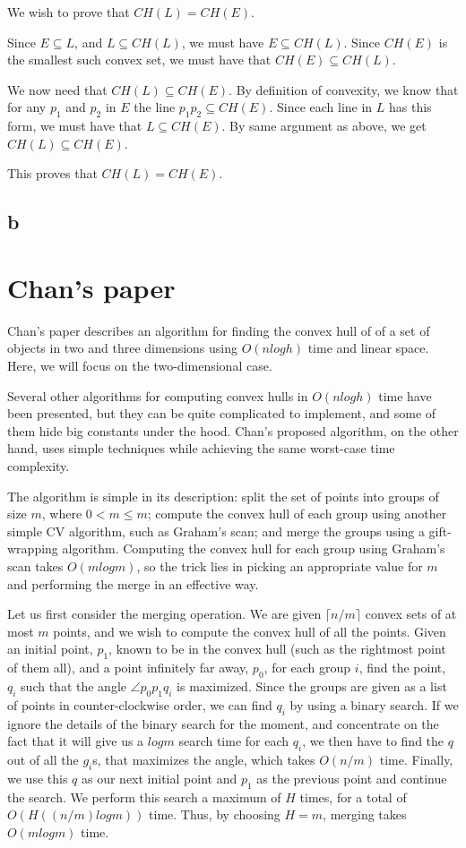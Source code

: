 \documentclass[11pt,a4paper]{article}
\begin{document}
We wish to prove that $CH(L) = CH(E)$.

Since $E \subseteq L$, and $L \subseteq CH(L)$, we must have $E \subseteq CH(L)$. Since
$CH(E)$ is the smallest such convex set, we must have that $CH(E) \subseteq CH(L)$.

We now need that $CH(L) \subseteq CH(E)$. By definition of convexity, we know that for any
$p_1$ and $p_2$ in $E$ the line $p_1p_2 \subseteq CH(E)$. Since each line in $L$ has this
form, we must have that $L \subseteq CH(E)$. By same argument as above, we get $CH(L) \subseteq CH(E)$.

This proves that $CH(L) = CH(E)$.

\subsection{b}

\section{Chan's paper}

Chan's paper describes an algorithm for finding the convex hull of of
a set of objects in two and three dimensions using $O(n log h)$ time and
linear space. Here, we will focus on the two-dimensional case.

Several other algorithms for computing convex hulls in $O(n log h)$ time
have been presented, but they can be quite complicated to implement,
and some of them hide big constants under the hood. Chan's proposed
algorithm, on the other hand, uses simple techniques while achieving
the same worst-case time complexity.

The algorithm is simple in its description: split the set of points
into groups of size $m$, where $0 < m \leq m$; compute the convex hull
of each group using another simple CV algorithm, such as Graham's
scan; and merge the groups using a gift-wrapping algorithm. Computing
the convex hull for each group using Graham's scan takes $O(m log m)$, so
the trick lies in picking an appropriate value for $m$ and performing
the merge in an effective way.

Let us first consider the merging operation. We are given $\lceil n /
m \rceil$ convex sets of at most $m$ points, and we wish to compute
the convex hull of all the points. Given an initial point, $p_1$,
known to be in the convex hull (such as the rightmost point of them
all), and a point infinitely far away, $p_0$, for each group $i$, find
the point, $q_i$ such that the angle $\angle p_0 p_1 q_i$ is
maximized. Since the groups are given as a list of points in
counter-clockwise order, we can find $q_i$ by using a binary
search. If we ignore the details of the binary search for the moment,
and concentrate on the fact that it will give us a $log m$ search time
for each $q_i$, we then have to find the $q$ out of all the $g_i$s,
that maximizes the angle, which takes $O(n / m)$ time. Finally, we use
this $q$ as our next initial point and $p_1$ as the previous point and
continue the search. We perform this search a maximum of $H$ times,
for a total of $O(H((n / m) log m))$ time. Thus, by choosing $H=m$,
merging takes $O(m log m)$ time.
\end{document}

